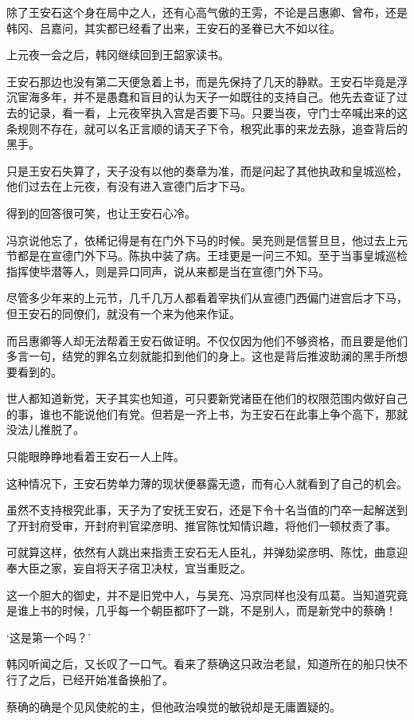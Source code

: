 除了王安石这个身在局中之人，还有心高气傲的王雱，不论是吕惠卿、曾布，还是韩冈、吕嘉问，其实都已经看了出来，王安石的圣眷已大不如以往。

上元夜一会之后，韩冈继续回到王韶家读书。

王安石那边也没有第二天便急着上书，而是先保持了几天的静默。王安石毕竟是浮沉宦海多年，并不是愚蠢和盲目的认为天子一如既往的支持自己。他先去查证了过去的记录，看一看，上元夜宰执入宫是否要下马。只要当夜，守门士卒喊出来的这条规则不存在，就可以名正言顺的请天子下令，根究此事的来龙去脉，追查背后的黑手。

只是王安石失算了，天子没有以他的奏章为准，而是问起了其他执政和皇城巡检，他们过去在上元夜，有没有进入宣德门后才下马。

得到的回答很可笑，也让王安石心冷。

冯京说他忘了，依稀记得是有在门外下马的时候。吴充则是信誓旦旦，他过去上元节都是在宣德门外下马。陈执中装了病。王珪更是一问三不知。至于当事皇城巡检指挥使毕潜等人，则是异口同声，说从来都是当在宣德门外下马。

尽管多少年来的上元节，几千几万人都看着宰执们从宣德门西偏门进宫后才下马，但王安石的同僚们，就没有一个来为他来作证。

而吕惠卿等人却无法帮着王安石做证明。不仅仅因为他们不够资格，而且要是他们多言一句，结党的罪名立刻就能扣到他们的身上。这也是背后推波助澜的黑手所想要看到的。

世人都知道新党，天子其实也知道，可只要新党诸臣在他们的权限范围内做好自己的事，谁也不能说他们有党。但若是一齐上书，为王安石在此事上争个高下，那就没法儿推脱了。

只能眼睁睁地看着王安石一人上阵。

这种情况下，王安石势单力薄的现状便暴露无遗，而有心人就看到了自己的机会。

虽然不支持根究此事，天子为了安抚王安石，还是下令十名当值的门卒一起解送到了开封府受审，开封府判官梁彦明、推官陈忱知情识趣，将他们一顿杖责了事。

可就算这样，依然有人跳出来指责王安石无人臣礼，并弹劾梁彦明、陈忱，曲意迎奉大臣之家，妄自将天子宿卫决杖，宜当重贬之。

这一个胆大的御史，并不是旧党中人，与吴充、冯京同样也没有瓜葛。当知道究竟是谁上书的时候，几乎每一个朝臣都吓了一跳，不是别人，而是新党中的蔡确！

‘这是第一个吗？’

韩冈听闻之后，又长叹了一口气。看来了蔡确这只政治老鼠，知道所在的船只快不行了之后，已经开始准备换船了。

蔡确的确是个见风使舵的主，但他政治嗅觉的敏锐却是无庸置疑的。

